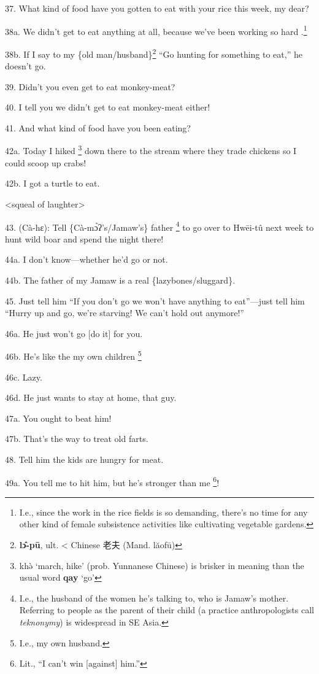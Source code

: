 37. What kind of food have you gotten to eat with your rice this week, my dear?

38a. We didn't get to eat anything at all, because we've been working so hard .\footnote{I.e., since the work in the rice fields is so demanding, there's no time for any other kind of female subsistence activities like cultivating vegetable gardens.}

38b. If I say to my \{old man/husband\}\footnote{\textbf{lɔ̂-pū}, ult. < Chinese 老夫 (Mand. lăofū)} ``Go hunting for something to eat,''
he doesn't go.

39. Didn't you even get to eat monkey-meat?

40. I tell you we didn't get to eat monkey-meat either!

41. And what kind of food have you been eating?

42a. Today I hiked \footnote{khə̀ `march, hike' (prob. Yunnanese Chinese) is brisker in meaning than the usual word \textbf{qay} `go'} down there to the stream where they trade chickens so I
could scoop up crabs!

42b. I got a turtle to eat.

<squeal of laughter>

43. (Cà-hɛ): Tell \{Cà-mɔ̀ʔ's/Jamaw's\} father \footnote{I.e., the husband of the women he's talking to, who is Jamaw's mother. Referring to people as the parent of their child (a practice anthropologists call \textit{teknonymy}) is widespread in SE Asia.} to go over to Hwēi-tû
next week to hunt wild boar and spend the night there!

44a. I don't know---whether he'd go or not.

44b. The father of my Jamaw is a real \{lazybones/sluggard\}.

45. Just tell him ``If you don't go we won't have anything to eat''---just tell
him ``Hurry up and go, we're starving! We can't hold out anymore!''

46a. He just won't go [do it] for you.

46b. He's like the my own children \footnote{I.e., my own husband.}

46c. Lazy.

46d. He just wants to stay at home, that guy.

47a. You ought to beat him!

47b. That's the way to treat old farts.

48. Tell him the kids are hungry for meat.

49a. You tell me to hit him, but he's stronger than me \footnote{Lit., ``I can't win [against] him.''}!

